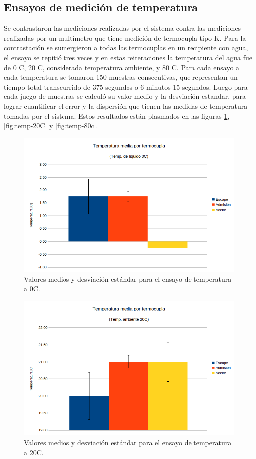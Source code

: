 \subsection{Ensayos de medición de temperatura}

Se contrastaron las mediciones realizadas por el sistema contra las mediciones realizadas por un multímetro que tiene medición de termocupla tipo K. Para la contrastación se sumergieron a todas las termocuplas en un recipiente con agua, el ensayo se repitió tres veces y en estas reiteraciones la temperatura del agua fue de 0 \degree C, 20 \degree C, considerada temperatura ambiente, y 80 \degree C. Para cada ensayo a cada temperatura se tomaron 150 muestras consecutivas, que representan un tiempo total transcurrido de 375 segundos o 6 minutos 15 segundos. Luego para cada juego de muestras se calculó su valor medio y la desviación estandar, para lograr cuantificar el error y la dispersión que tienen las medidas de temperatura tomadas por el sistema. Estos resultados están plasmados en las figuras \ref{fig:temp-0c}, \ref{fig:temp-20C} y \ref{fig:temp-80c}.

\begin{figure}[htpb]
\centering
\includegraphics[width=.9\textwidth]{./Figures/temp-0c.png}
\caption{Valores medios y desviación estándar para el ensayo de temperatura a 0C.}
\label{fig:temp-0c}
\end{figure}

\begin{figure}[htpb]
\centering
\includegraphics[width=.9\textwidth]{./Figures/temp-20c.png}
\caption{Valores medios y desviación estándar para el ensayo de temperatura a 20C.}
\label{fig:temp-20c}
\end{figure}

